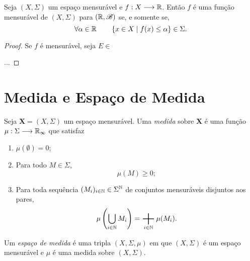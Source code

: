 \begin{prop}
	Seja $(X,\Sigma)$ um espaço mensurável e $f: X \longrightarrow \mathbb{R}$. Então $f$ é uma função mensurável de $(X,\Sigma)$ para $(\mathbb{R},\mathscr{B})$ se, e somente se,
	\begin{equation*}
	\forall \alpha \in \mathbb{R} \qquad \left\{x \in X \;\middle\vert\; f(x) \leq \alpha \right\} \in \Sigma.
	\end{equation*}
\end{prop}
\begin{proof}
	Se $f$ é mensurável, seja $E \in$
	
	...
\end{proof}
\newpage









\section{Medida e Espaço de Medida}

\begin{defi}
Seja $\bm X=(X,\Sigma)$ um espaço mensurável. Uma \emph{medida} sobre $\bm X$ é uma função $\mu : \Sigma \longrightarrow \mathbb{R}_\infty$ que satisfaz
	\begin{enumerate}
	\item $\mu(\emptyset)=0$;
	\item Para todo $M \in \Sigma$,
	\begin{equation*}
	\mu(M) \geq 0;
	\end{equation*}
	\item Para toda sequência $(M_i)_{i \in \mathbb{N}} \in \Sigma^{\mathbb{N}}$ de conjuntos mensuráveis disjuntos aos pares,
	\begin{equation*}
	\mu\left(\bigcup_{i \in \N} M_i\right)=\bigplus_{i \in \N} \mu(M_i).
	\end{equation*}
	\end{enumerate}
\end{defi}

\begin{defi}
	Um \emph{espaço de medida} é uma tripla $(X,\Sigma,\mu)$ em que $(X,\Sigma)$ é um espaço mensurável e $\mu$ é uma medida sobre $(X,\Sigma)$.
\end{defi}

